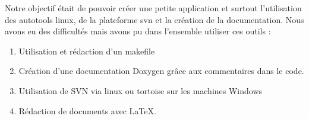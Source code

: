 \documentclass[a4paper 12pts]{article}
\begin{document}
Notre objectif était de pouvoir créer une petite application et surtout l'utilisation des autotools linux, de la plateforme svn et la création de la documentation.
Nous avons eu des difficultés mais avons pu dans l'ensemble utiliser ces outils : 

\begin{enumerate}
\item Utilisation et rédaction d'un makefile 
\item Création d'une documentation Doxygen grâce aux commentaires dans le code.
\item Utilisation de SVN via linux ou tortoise sur les machines Windows
\item Rédaction de documents avec \LaTeX.
\end{enumerate}
\end{document}
